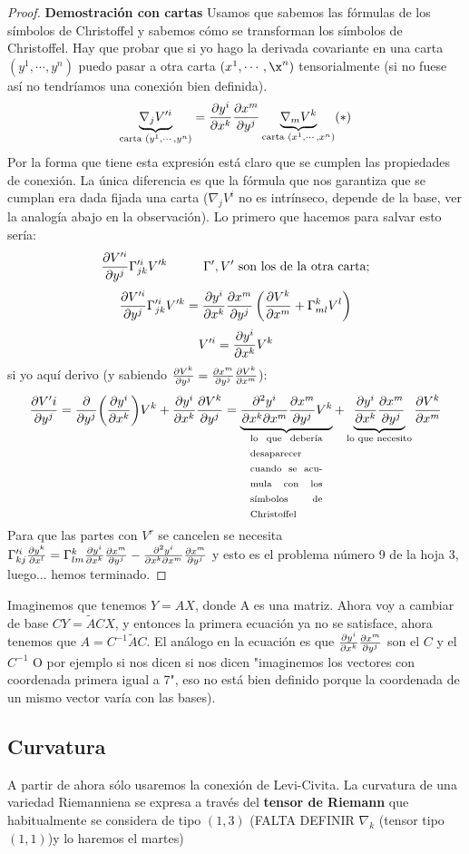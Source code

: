 \documentclass[palatino, bibnumbers]{apuntes}
\begin{document}
\begin{proof}\textbf{Demostración con cartas} Usamos que sabemos las fórmulas de los símbolos de Christoffel y sabemos cómo se transforman los símbolos de Christoffel. Hay que probar que si yo hago la derivada covariante en una carta $(y^1,\cdots,y^n)$ puedo pasar a otra carta $(x^1,\cdots,\x^n)$ tensorialmente (si no fuese así no tendríamos una conexión bien definida). $$\underbrace{\nabla_jV'^i}_{\text{carta }(y^1,\cdots,y^n)}=\pdv{y^i}{x^k}\pdv{x^m}{y^j}\underbrace{\nabla_mV^k}_{\text{carta }(x^1,\cdots,x^n)}(*)$$ Por la forma que tiene esta expresión está claro que se cumplen las propiedades de conexión. La única diferencia es que la fórmula que nos garantiza que se cumplan era dada fijada una carta ($\nabla_jV^i$ no es intrínseco, depende de la base, ver la analogía abajo en la observación). 
	Lo primero que hacemos para salvar esto sería: $$\pdv{V'^i}{y^j}\Gamma'^i_{jk}V'^k\hspace*{1cm}\Gamma',V'\text{ son los de la otra carta;}$$
	$$\pdv{V'^i}{y^j}\Gamma'^i_{jk}V'^k=\pdv{y^i}{x^k}\pdv{x^m}{y^j}\left(\pdv{V^k}{x^m}+\Gamma^k_{ml}V^l\right)$$
	$$V'^i=\pdv{y^i}{x^k}V^k$$ si yo aquí derivo (y sabiendo $\pdv{V^k}{y^j}=\pdv{x^m}{y^j}\pdv{V^k}{x^m}$): $$\pdv{V'i}{y^j}=\pdv{y^j}(\pdv{y^i}{x^k})V^k+\pdv{y^i}{x^k}\pdv{V^k}{y^j}=\underbrace{\pdv{y^i}{x^k}{x^m}\pdv{x^m}{y^j}V^k}_{\text{\parbox{2cm}{lo que debería desaparecer cuando se acumula con los símbolos de Christoffel}}}+\underbrace{\pdv{y^i}{x^k}\pdv{x^m}{y^j}}_{\text{lo que necesito}}\pdv{V^k}{x^m}$$
	Para que las partes con $V^r$ se cancelen se necesita $\Gamma'^i_{kj}\pdv{y^k}{x^l}=\Gamma^k_{lm}\pdv{y^i}{x^k}\pdv{x^m}{y^j}-\pdv{y^i}{x^k}{x^m}\pdv{x^m}{y^j}$ y esto es el problema número 9 de la hoja 3, luego... hemos terminado.
\end{proof}
\begin{obs} Imaginemos que tenemos $Y=AX$, donde A es una matriz. Ahora voy a cambiar de base $CY=\tilde{A}CX$, y entonces la primera ecuación ya no se satisface, ahora tenemos que $A=C^{-1}\tilde{A}C$. El análogo en la ecuación es que $\pdv{y^i}{x^k}\pdv{x^m}{y^j}$ son el $C$ y el $C^{-1}$
O por ejemplo si nos dicen si nos dicen "imaginemos los vectores con coordenada primera igual a 7", eso no está bien definido porque la coordenada de un mismo vector varía con las bases). 
\end{obs}
\subsection{Curvatura}
 A partir de ahora sólo usaremos la conexión de Levi-Civita. La curvatura de una variedad Riemanniena se expresa a través del \textbf{tensor de Riemann} que habitualmente se considera de tipo $(1,3)$
 (FALTA DEFINIR $\nabla_k$ (tensor tipo $(1,1)$)y lo haremos el martes)
 
\end{document}
